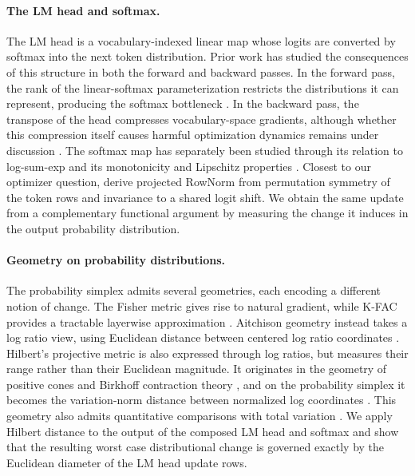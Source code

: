 \documentclass[anon]{opt2026} %
\begin{document}
\paragraph{The LM head and softmax.}
The LM head is a vocabulary-indexed linear map whose logits are converted by
softmax into the next token distribution. Prior work has studied the
consequences of this structure in both the forward and backward passes. In the
forward pass, the rank of the linear-softmax parameterization restricts the
distributions it can represent, producing the softmax bottleneck
\citep{yang2017breaking,chang2022softmax}. In the backward pass, the transpose
of the head compresses vocabulary-space gradients, although whether this
compression itself causes harmful optimization dynamics remains under
discussion \citep{godey2026lost,murugan2026doeslmheadcreate}. The softmax map
has separately been studied through its relation to log-sum-exp and its
monotonicity and Lipschitz properties
\citep{gao2017properties,nair2025softmax}. Closest to our optimizer question,
\citet{lau2026symmetry} derive projected RowNorm from permutation symmetry of
the token rows and invariance to a shared logit shift. We obtain the same
update from a complementary functional argument by measuring the change it
induces in the output probability distribution.


\paragraph{Geometry on probability distributions.}
The probability simplex admits several geometries, each encoding a different
notion of change. The Fisher metric
gives rise to natural gradient, while K-FAC provides a tractable layerwise
approximation \citep{amari1998natural,martens2015optimizing}. Aitchison
geometry instead takes a log ratio view, using Euclidean distance between
centered log ratio coordinates
\citep{10.1111/j.2517-6161.1982.tb01195.x}. Hilbert's projective metric is
also expressed through log ratios, but measures their range rather than their
Euclidean magnitude. It originates in the geometry of positive cones and
Birkhoff contraction theory \citep{birkhoff1957extensions,de1993hilbert}, and
on the probability simplex it becomes the variation-norm distance between
normalized log coordinates \citep{gaubert2015dobrushin, Nielsen_2018, nielsen2023non}. This geometry also admits
quantitative comparisons with total variation
\citep{cohen2023hyperbolic}. We apply Hilbert distance to the output of the
composed LM head and softmax and show that the resulting worst case
distributional change is governed exactly by the Euclidean diameter of the
LM head update rows.
\end{document}
